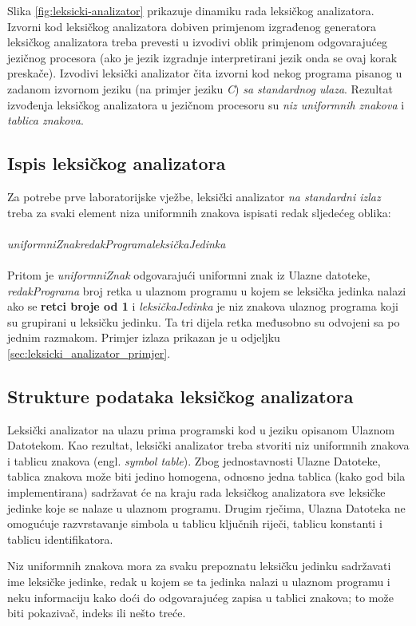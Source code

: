 \documentclass[times, 12pt, utf8]{book}
\begin{document}
Slika \ref{fig:leksicki-analizator} prikazuje dinamiku rada leksičkog analizatora.
Izvorni kod leksičkog analizatora dobiven primjenom izgrađenog generatora leksičkog analizatora treba prevesti u izvodivi oblik primjenom odgovarajućeg jezičnog procesora (ako je jezik izgradnje interpretirani jezik onda se ovaj korak preskače).
Izvodivi leksički analizator čita izvorni kod nekog programa pisanog u zadanom izvornom jeziku (na primjer jeziku \emph{C}) \emph{sa standardnog ulaza}.
Rezultat izvođenja leksičkog analizatora u jezičnom procesoru su \emph{niz uniformnih znakova} i \emph{tablica znakova}.

\subsection{Ispis leksičkog analizatora}
Za potrebe prve laboratorijske vježbe, leksički analizator \emph{na standardni izlaz} treba za svaki element niza uniformnih znakova ispisati redak sljedećeg oblika:\\
\\
\emph{uniformniZnak}\textvisiblespace\emph{redakPrograma}\textvisiblespace\emph{leksičkaJedinka}\\
\\
Pritom je \emph{uniformniZnak} odgovarajući uniformni znak iz Ulazne datoteke, \emph{redakPrograma} broj retka u ulaznom programu u kojem se leksička jedinka nalazi ako se \textbf{retci broje od 1} i \emph{leksičkaJedinka} je niz znakova ulaznog programa koji su grupirani u leksičku jedinku.
Ta tri dijela retka međusobno su odvojeni sa po jednim razmakom.
Primjer izlaza prikazan je u odjeljku \ref{sec:leksicki_analizator_primjer}.

\subsection{Strukture podataka leksičkog analizatora}
Leksički analizator na ulazu prima programski kod u jeziku opisanom Ulaznom Datotekom.
Kao rezultat, leksički analizator treba stvoriti niz uniformnih znakova i tablicu znakova (engl. \emph{symbol table}).
Zbog jednostavnosti Ulazne Datoteke, tablica znakova može biti jedino homogena, odnosno jedna tablica (kako god bila implementirana) sadržavat će na kraju rada leksičkog analizatora sve leksičke jedinke koje se nalaze u ulaznom programu.
Drugim rječima, Ulazna Datoteka ne omogućuje razvrstavanje simbola u tablicu ključnih riječi, tablicu konstanti i tablicu identifikatora.

Niz uniformnih znakova mora za svaku prepoznatu leksičku jedinku sadržavati ime leksičke jedinke, redak u kojem se ta jedinka nalazi u ulaznom programu i neku informaciju kako doći do odgovarajućeg zapisa u tablici znakova; to može biti pokazivač, indeks ili nešto treće.
\end{document}
